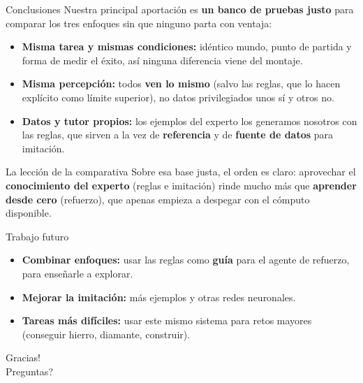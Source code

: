 \documentclass[aspectratio=169,10pt]{beamer}
\newcommand{\hl}[1]{\textcolor{UDCmag}{\textbf{#1}}}
\begin{document}
\begin{frame}{Conclusiones}
  Nuestra principal aportación es \hl{un banco de pruebas justo} para comparar los tres
  enfoques sin que ninguno parta con ventaja:
  \begin{itemize}\itemsep6pt
    \item \hl{Misma tarea y mismas condiciones:} idéntico mundo, punto de partida y forma de
    medir el éxito, así ninguna diferencia viene del montaje.
    \item \hl{Misma percepción:} todos \hl{ven lo mismo} (salvo las reglas, que lo hacen
    explícito como límite superior), no datos privilegiados unos sí y otros no.
    \item \hl{Datos y tutor propios:} los ejemplos del experto los generamos nosotros con las
    reglas, que sirven a la vez de \hl{referencia} y de \hl{fuente de datos} para imitación.
  \end{itemize}

  \vspace{0.6em}
  \begin{alertblock}{La lección de la comparativa}
    \footnotesize Sobre esa base justa, el orden es claro: aprovechar el \hl{conocimiento del
    experto} (reglas e imitación) rinde mucho más que \hl{aprender desde cero} (refuerzo), que
    apenas empieza a despegar con el cómputo disponible.
  \end{alertblock}
\end{frame}

\begin{frame}{Trabajo futuro}
  \begin{itemize}\itemsep6pt
    \item \hl{Combinar enfoques:} usar las reglas como \hl{guía} para el agente de refuerzo,
    para enseñarle a explorar.
    \item \hl{Mejorar la imitación:} más ejemplos y otras redes neuronales.
    \item \hl{Tareas más difíciles:} usar este mismo sistema para retos mayores
    (conseguir hierro, diamante, construir).
  \end{itemize}
\end{frame}

\begin{frame}[standout]
  \textexclamdown Gracias!\\[0.4em]
  {\normalsize \textquestiondown Preguntas?}
\end{frame}
\end{document}
